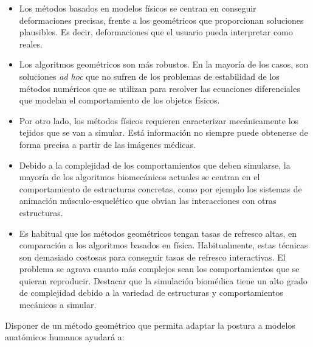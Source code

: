 \begin{itemize}
\item Los métodos basados en modelos físicos se centran en conseguir deformaciones precisas, frente a los geométricos que proporcionan soluciones plausibles. Es decir, deformaciones que el usuario pueda interpretar como reales. 


\item Los algoritmos geométricos son más robustos. En la mayoría de los casos, son soluciones \emph{ad hoc} que no sufren de los problemas de estabilidad de los métodos numéricos que se utilizan para resolver las ecuaciones diferenciales que modelan el comportamiento de los objetos físicos. %

\item Por otro lado, los métodos físicos requieren caracterizar mecánicamente los tejidos que se van a simular. Está información no siempre puede obtenerse de forma precisa a partir de las imágenes médicas.

\item Debido a la complejidad de los comportamientos que deben simularse, la mayoría de los algoritmos biomecánicos actuales se centran en el comportamiento de estructuras concretas, como por ejemplo los sistemas de animación músculo-esquelético que obvian las interacciones con otras estructuras. 

\item Es habitual que los métodos geométricos tengan tasas de refresco altas, en comparación a los algoritmos basados en física. Habitualmente, estas técnicas son demasiado costosas para conseguir tasas de refresco interactivas. El problema se agrava cuanto más complejos sean los comportamientos que se quieran reproducir. Destacar que la simulación biomédica tiene un alto grado de complejidad debido a la variedad de estructuras y comportamientos mecánicos a simular.

\end{itemize}

Disponer de un método geométrico que permita adaptar la postura a modelos anatómicos humanos ayudará a:

